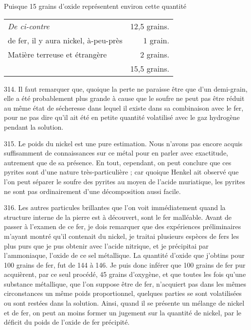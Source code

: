 \documentclass[a4paper, 11pt, oneside, polutonikogreek, french]{article}
\begin{document}
Puisque 15 grains d'oxide représentent environ cette quantité

\begin{table}[!ht]
    \centering
    \begin{tabular}{l r}
        \emph{De ci-contre} & 12,5 grains. \\
        de fer, il y aura nickel, à-peu-près & 1 grain. \\
        Matière terreuse et étrangère & 2 grains. \\ \hline
        ~ & 15,5 grains. \\
    \end{tabular}
\end{table}

314. Il faut remarquer que, quoique la perte ne paraisse être que d'un demi-grain, elle a été probablement plus grande à cause que le soufre ne peut pas être réduit au même état de sécheresse dans lequel il existe dans sa combinaison avec le fer, pour ne pas dire qu'il ait été en petite quantité volatilisé avec le gaz hydrogène pendant la solution.

315. Le poids du nickel est une pure estimation. Nous n'avons pas encore acquis suffisamment de connaissances sur ce métal pour en parler avec exactitude, autrement que de sa présence. En tout, cependant, on peut conclure que ces pyrites sont d'une nature très-particulière ; car quoique Henkel ait observé que l'on peut séparer le soufre des pyrites au moyen de l'acide muriatique, les pyrites ne sont pas ordinairement d'une décomposition aussi facile.

316. Les autres particules brillantes que l'on voit immédiatement quand la structure interne de la pierre est à découvert, sont le fer malléable. Avant de passer à l'examen de ce fer, je dois remarquer que des expériences préliminaires m'ayant montré qu'il contenait du nickel, je traitai plusieurs espèces de fers les plus purs que je pus obtenir avec l'acide nitrique, et je précipitai par l'ammoniaque, l'oxide de ce sel métallique. La quantité d'oxide que j'obtins pour 100 grains de fer, fut de 144 à 146. Je puis donc inférer que 100 grains de fer pur acquièrent, par ce seul procédé, 45 grains d'oxygène, et que toutes les fois qu'une substance métallique, que l'on suppose être de fer, n'acquiert pas dans les mêmes circonstances un même poids proportionnel, quelques parties se sont volatilisées ou sont restées dans la solution. Ainsi, quand il se présente un mélange de nickel et de fer, on peut an moins former un jugement sur la quantité de nickel, par le déficit du poids de l'oxide de fer précipité.
\end{document}
